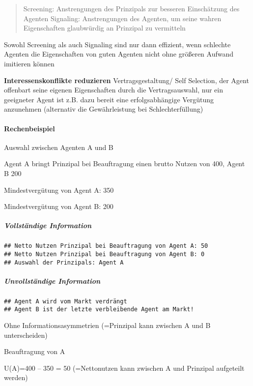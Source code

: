 \documentclass[
]{article}
\begin{document}
\begin{quote}
Screening: Anstrengungen des Prinzipals zur besseren Einschätzung des
Agenten Signaling: Anstrengungen des Agenten, um seine wahren
Eigenschaften glaubwürdig an Prinzipal zu vermitteln
\end{quote}

Sowohl Screening als auch Signaling sind nur dann effizient, wenn
schlechte Agenten die Eigenschaften von guten Agenten nicht ohne
größeren Aufwand imitieren können

\textbf{Interessenskonflikte reduzieren} Vertragsgestaltung/ Self
Selection, der Agent offenbart seine eigenen Eigenschaften durch die
Vertragsauswahl, nur ein geeigneter Agent ist z.B. dazu bereit eine
erfolgsabhängige Vergütung anzunehmen (alternativ die Gewährleistung bei
Schlechterfüllung)

\hypertarget{rechenbeispiel}{%
\paragraph{Rechenbeispiel}\label{rechenbeispiel}}

Auswahl zwischen Agenten A und B

Agent A bringt Prinzipal bei Beauftragung einen brutto Nutzen von 400,
Agent B 200

Mindestvergütung von Agent A: 350

Mindestvergütung von Agent B: 200

\hypertarget{vollstuxe4ndige-information}{%
\subparagraph{Vollständige
Information}\label{vollstuxe4ndige-information}}

\begin{verbatim}
## Netto Nutzen Prinzipal bei Beauftragung von Agent A: 50
## Netto Nutzen Prinzipal bei Beauftragung von Agent B: 0
## Auswahl der Prinzipals: Agent A
\end{verbatim}

\hypertarget{unvollstuxe4ndige-information}{%
\subparagraph{Unvollständige
Information}\label{unvollstuxe4ndige-information}}

\begin{verbatim}
## Agent A wird vom Markt verdrängt
## Agent B ist der letzte verbleibende Agent am Markt!
\end{verbatim}

Ohne Informationsasymmetrien (=Prinzipal kann zwischen A und B
unterscheiden)

Beauftragung von A

U(A)=400 -- 350 = 50 (=Nettonutzen kann zwischen A und Prinzipal
aufgeteilt werden)
\end{document}
